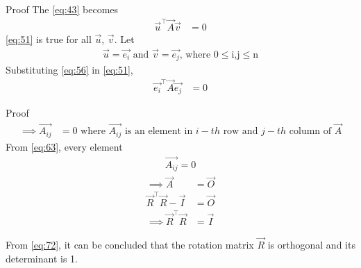 \documentclass{beamer}
\begin{document}
\begin{frame}{Proof}
The \eqref{eq:43} becomes
\begin{align}
    \vec{u}^\top\vec{A}\vec{v} &= 0 \label{eq:51}
\end{align}
\eqref{eq:51} is true for all $\vec{u}$, $\vec{v}$.
Let
\begin{align}
    \vec{u} = \vec{e_i}\text{ and }\vec{v} = \vec{e_j}\text{, where 0$\leq$i,j$\leq$n} \label{eq:56}
\end{align}
Substituting \eqref{eq:56} in \eqref{eq:51},
\begin{align}
    \vec{e_i}^\top\vec{A}\vec{e_j} &= 0
\end{align}
\end{frame}

\begin{frame}{Proof}
\begin{align}
    \implies \vec{A_{ij}} &= 0\text{ where $\vec{A_{ij}}$ is an element in $i-th$ row and $j-th$ column of $\vec{A}$} \label{eq:63}
\end{align}
From \eqref{eq:63}, every element 
\begin{align}
    \vec{A_{ij}} = 0
\end{align}
\begin{align}
    \implies \vec{A} &= \vec{O} \\
    \vec{R}^\top\vec{R} - \vec{I} &= \vec{O} \\
    \implies \vec{R}^\top\vec{R} &= \vec{I} \label{eq:72}
\end{align}

From \eqref{eq:72}, it can be concluded that the rotation matrix $\vec{R}$ is orthogonal and its determinant is 1.
\end{frame}
\end{document}
